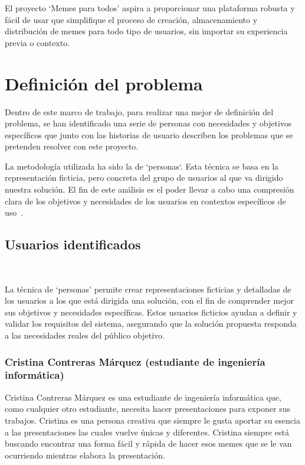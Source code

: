 El proyecto `Memes para todos' aspira a proporcionar una plataforma robusta y fácil de usar que simplifique el proceso de creación, almacenamiento y distribución de memes para todo tipo de usuarios, sin importar su experiencia previa o contexto.

\section{Definición del problema}

Dentro de este marco de trabajo, para realizar una mejor de definición del problema, se han identificado una serie de personas con necesidades y objetivos específicos que junto con las historias de usuario describen los problemas que se pretenden resolver con este proyecto.

La metodología utilizada ha sido la de `personas`. Esta técnica se basa en la representación ficticia, pero concreta del grupo de usuarios al que va dirigido nuestra solución. El fin de este análisis es el poder llevar a cabo una compresión clara de los objetivos y necesidades de los usuarios en contextos específicos de uso~\cite{cooper2014face}.

\subsection{Usuarios identificados}~\label{sec:usuarios_identificados}

    La técnica de `personas' permite crear representaciones ficticias y detalladas de los usuarios a los que está dirigida una solución, con el fin de comprender mejor sus objetivos y necesidades específicas. Estos usuarios ficticios ayudan a definir y validar los requisitos del sistema, asegurando que la solución propuesta responda a las necesidades reales del público objetivo.

    \subsubsection{Cristina Contreras Márquez (estudiante de ingeniería informática)}

    Cristina Contreras Márquez es una estudiante de ingeniería informática que, como cualquier otro estudiante, necesita hacer presentaciones para exponer sus trabajos. Cristina es una persona creativa que siempre le gusta aportar su esencia a las presentaciones las cuales vuelve únicas y diferentes. Cristina siempre está buscando encontrar una forma fácil y rápida de hacer esos memes que se le van ocurriendo mientras elabora la presentación.


